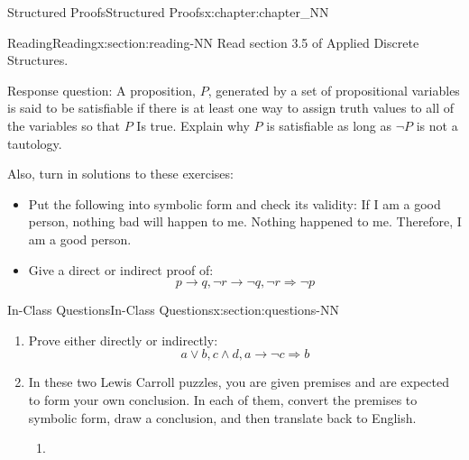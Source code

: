 \documentclass[oneside,10pt,]{book}
\numberwithin{equation}{section}
\begin{document}
\begin{chapterptx}{Structured Proofs}{}{Structured Proofs}{}{}{x:chapter:chapter_NN}
%
%
%
\typeout{************************************************}
\typeout{************************************************}
%
\begin{sectionptx}{Reading}{}{Reading}{}{}{x:section:reading-NN}
Read section 3.5 of Applied Discrete Structures.%
\par
Response question: A proposition, \(P\), generated by a set of propositional variables is said to be satisfiable if there is at least one way to assign truth values to all of the variables so that \(P\) Is true. Explain why \(P\) is satisfiable as long as \(\neg P\)  is not a tautology.%
\par
Also, turn in solutions to these exercises:%
\begin{itemize}[label=\textbullet]
\item{}Put the following into symbolic form and check its validity: If I am a good person, nothing bad will happen to me. Nothing happened to me. Therefore, I am a good person.%
\item{}Give  a direct or indirect proof of:%
\begin{equation*}
p\rightarrow  q, \neg r\rightarrow  \neg q, \neg r \Rightarrow  \neg p
\end{equation*}
%
\end{itemize}
%
\end{sectionptx}
%
%
\typeout{************************************************}
\typeout{************************************************}
%
\begin{sectionptx}{In-Class Questions}{}{In-Class Questions}{}{}{x:section:questions-NN}
%
\begin{enumerate}[label=\arabic*.]
\item{}Prove either directly or indirectly:%
\begin{equation*}
a \lor  b, c \land  d, a \rightarrow  \neg c \Rightarrow  b
\end{equation*}
%
\item{}In these two Lewis Carroll puzzles, you are given premises and are expected to form your own conclusion.  In each of them, convert the premises to symbolic form, draw a conclusion, and then translate back to English.%
\begin{enumerate}[label=(\alph*)]
\item{}%
\begin{itemize}[label=\textbullet]

\end{itemize}
\end{enumerate}
\end{enumerate}
\end{sectionptx}
\end{chapterptx}
\end{document}
